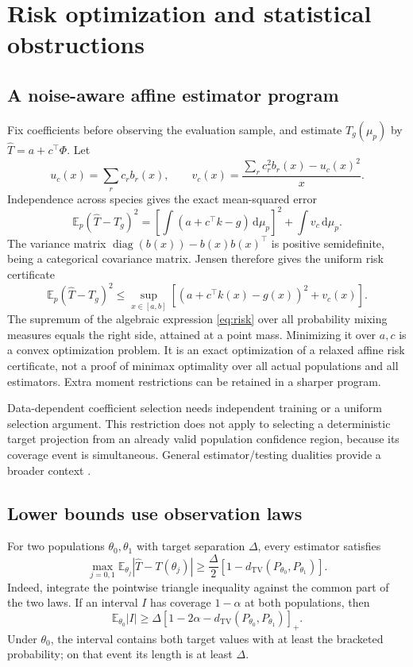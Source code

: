 \documentclass[11pt]{article}
\numberwithin{equation}{section}
\theoremstyle{definition}
\theoremstyle{remark}
\newcommand{\E}{\mathbb E}
\newcommand{\TV}{d_{\mathrm{TV}}}
\newcommand{\diag}{\operatorname{diag}}
\newcommand{\dd}{\,\mathrm d}
\begin{document}
\section{Risk optimization and statistical obstructions}\label{sec:risk}
\subsection{A noise-aware affine estimator program}
Fix coefficients before observing the evaluation sample, and estimate $T_g(\mu_p)$ by $\widehat T=a+c^\top\Phi$. Let
\[
 u_c(x)=\sum_rc_rb_r(x),\qquad
 v_c(x)=\frac{\sum_rc_r^2b_r(x)-u_c(x)^2}{x}.
\]
Independence across species gives the exact mean-squared error
\begin{equation}\label{eq:risk}
 \E_p(\widehat T-T_g)^2
 =\left[\int(a+c^\top k-g)\dd\mu_p\right]^2+\int v_c\dd\mu_p.
\end{equation}
The variance matrix $\diag(b(x))-b(x)b(x)^\top$ is positive semidefinite, being a categorical covariance matrix. Jensen therefore gives the uniform risk certificate
\begin{equation}\label{eq:risksup}
 \E_p(\widehat T-T_g)^2\le
 \sup_{x\in[a,b]}\left[(a+c^\top k(x)-g(x))^2+v_c(x)\right].
\end{equation}
The supremum of the algebraic expression \eqref{eq:risk} over all probability mixing measures equals the right side, attained at a point mass. Minimizing it over $a,c$ is a convex optimization problem. It is an exact optimization of a relaxed affine risk certificate, not a proof of minimax optimality over all actual populations and all estimators. Extra moment restrictions can be retained in a sharper program.

Data-dependent coefficient selection needs independent training or a uniform selection argument. This restriction does not apply to selecting a deterministic target projection from an already valid population confidence region, because its coverage event is simultaneous. General estimator/testing dualities provide a broader context \cite{PolyanskiyWu2019}.

\subsection{Lower bounds use observation laws}
For two populations $\theta_0,\theta_1$ with target separation $\Delta$, every estimator satisfies
\begin{equation}\label{eq:twopoint}
 \max_{j=0,1}\E_{\theta_j}|\widehat T-T(\theta_j)|
 \ge\frac\Delta2\left[1-\TV(P_{\theta_0},P_{\theta_1})\right].
\end{equation}
Indeed, integrate the pointwise triangle inequality against the common part of the two laws. If an interval $I$ has coverage $1-\alpha$ at both populations, then
\begin{equation}\label{eq:intervalLB}
 \E_{\theta_0}|I|\ge
 \Delta[1-2\alpha-\TV(P_{\theta_0},P_{\theta_1})]_+.
\end{equation}
Under $\theta_0$, the interval contains both target values with at least the bracketed probability; on that event its length is at least $\Delta$.
\end{document}
